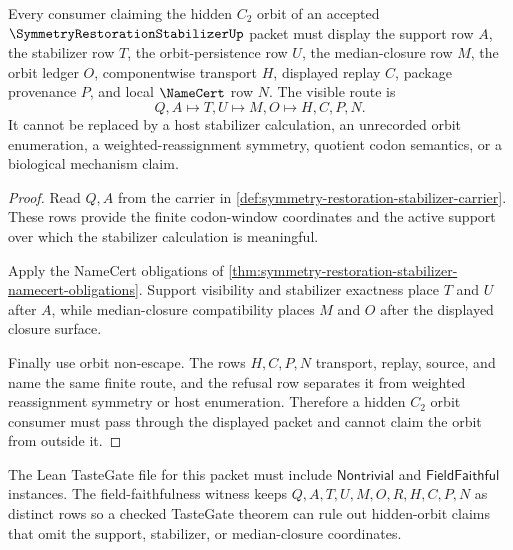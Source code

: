 \begin{theorem}
\label{thm:symmetry-restoration-orbit-nonescape}
Every consumer claiming the hidden $C_{2}$ orbit of an accepted
$\SymmetryRestorationStabilizerUp$ packet must display the support row $A$,
the stabilizer row $T$, the orbit-persistence row $U$, the median-closure row
$M$, the orbit ledger $O$, componentwise transport $H$, displayed replay $C$,
package provenance $P$, and local $\NameCert$ row $N$. The visible route is
$$
Q,A \longmapsto T,U \longmapsto M,O \longmapsto H,C,P,N .
$$
It cannot be replaced by a host stabilizer calculation, an unrecorded orbit
enumeration, a weighted-reassignment symmetry, quotient codon semantics, or a
biological mechanism claim.
\end{theorem}
\begin{proof}
Read $Q,A$ from the carrier in
\autoref{def:symmetry-restoration-stabilizer-carrier}. These rows provide
the finite codon-window coordinates and the active support over which the
stabilizer calculation is meaningful.

Apply the NameCert obligations of
\autoref{thm:symmetry-restoration-stabilizer-namecert-obligations}. Support
visibility and stabilizer exactness place $T$ and $U$ after $A$, while
median-closure compatibility places $M$ and $O$ after the displayed closure
surface.

Finally use orbit non-escape. The rows $H,C,P,N$ transport, replay, source,
and name the same finite route, and the refusal row separates it from
weighted reassignment symmetry or host enumeration. Therefore a hidden
$C_{2}$ orbit consumer must pass through the displayed packet and cannot
claim the orbit from outside it.
\end{proof}



The Lean TasteGate file for this packet must include $\mathsf{Nontrivial}$
and $\mathsf{FieldFaithful}$ instances. The field-faithfulness witness keeps
$Q,A,T,U,M,O,R,H,C,P,N$ as distinct rows so a checked TasteGate theorem can
rule out hidden-orbit claims that omit the support, stabilizer, or
median-closure coordinates.

